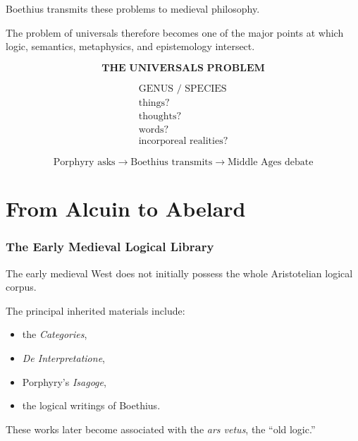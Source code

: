 \documentclass[11pt]{article}
\newcommand{\latin}[1]{\textit{#1}}
\begin{document}
Boethius transmits these problems to medieval philosophy.

The problem of universals therefore becomes one of the major
points at which logic, semantics, metaphysics, and epistemology
intersect.

\begin{whiteboard}
\[
\textbf{THE UNIVERSALS PROBLEM}
\]

\[
\begin{array}{c}
\text{GENUS / SPECIES}\\[0.4em]
\text{things?}\\
\text{thoughts?}\\
\text{words?}\\
\text{incorporeal realities?}
\end{array}
\]

\[
\text{Porphyry asks}
\longrightarrow
\text{Boethius transmits}
\longrightarrow
\text{Middle Ages debate}
\]
\end{whiteboard}


\part{From Alcuin to Abelard}

\section{The Early Medieval Logical Library}

The early medieval West does not initially possess the whole
Aristotelian logical corpus.

The principal inherited materials include:

\begin{itemize}
    \item the \textit{Categories},
    \item \textit{De Interpretatione},
    \item Porphyry's \textit{Isagoge},
    \item the logical writings of Boethius.
\end{itemize}

These works later become associated with the \latin{ars vetus},
the ``old logic.''
\end{document}
